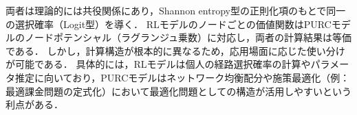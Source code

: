 両者は理論的には共役関係にあり，Shannon entropy型の正則化項のもとで同一の選択確率（Logit型）を導く．
RLモデルのノードごとの価値関数はPURCモデルのノードポテンシャル（ラグランジュ乗数）に対応し，両者の計算結果は等価である．
しかし，計算構造が根本的に異なるため，応用場面に応じた使い分けが可能である．
具体的には，RLモデルは個人の経路選択確率の計算やパラメータ推定に向いており，PURCモデルはネットワーク均衡配分や施策最適化（例：最適課金問題の定式化）において最適化問題としての構造が活用しやすいという利点がある．